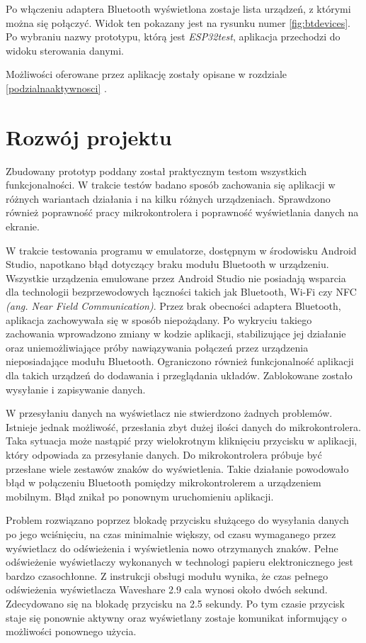 \documentclass[a4paper,12pt, twoside]{article}
\begin{document}
    	Po włączeniu adaptera Bluetooth wyświetlona zostaje lista urządzeń, z którymi można się połączyć. Widok ten pokazany jest na rysunku numer \ref{fig:btdevices}. Po wybraniu nazwy prototypu, którą jest \textit{ESP32test}, aplikacja przechodzi do widoku sterowania danymi.
    	
    	Możliwości oferowane przez aplikację zostały opisane w rozdziale \ref{podzialnaaktywnosci} .
    	\section{Rozwój projektu}
    	Zbudowany prototyp poddany został praktycznym testom wszystkich funkcjonalności. W trakcie testów badano sposób zachowania się aplikacji w różnych wariantach działania i na kilku różnych urządzeniach. Sprawdzono również poprawność pracy mikrokontrolera i poprawność wyświetlania danych na ekranie.
    	
    	W trakcie testowania programu w emulatorze, dostępnym w środowisku Android Studio, napotkano błąd dotyczący braku modułu Bluetooth w urządzeniu. Wszystkie urządzenia emulowane przez Android Studio nie posiadają wsparcia dla technologii bezprzewodowych łączności takich jak Bluetooth, Wi-Fi czy NFC \textit{(ang. Near Field Communication)}. Przez brak obecności adaptera Bluetooth, aplikacja zachowywała się w sposób niepożądany. Po wykryciu takiego zachowania wprowadzono zmiany w kodzie aplikacji, stabilizujące jej działanie oraz uniemożliwiające próby nawiązywania połączeń przez urządzenia nieposiadające modułu Bluetooth. Ograniczono również funkcjonalność aplikacji dla takich urządzeń do dodawania i przeglądania układów. Zablokowane zostało wysyłanie i zapisywanie danych.
    	
    	W przesyłaniu danych na wyświetlacz nie stwierdzono żadnych problemów. Istnieje jednak możliwość, przesłania zbyt dużej ilości danych do mikrokontrolera. Taka sytuacja może nastąpić przy wielokrotnym kliknięciu przycisku w aplikacji, który odpowiada za przesyłanie danych. Do mikrokontrolera próbuje być przesłane wiele zestawów znaków do wyświetlenia. Takie działanie powodowało błąd w połączeniu Bluetooth pomiędzy mikrokontrolerem a urządzeniem mobilnym. Błąd znikał po ponownym uruchomieniu aplikacji.
    	
    	Problem rozwiązano poprzez blokadę przycisku służącego do wysyłania danych po jego wciśnięciu, na czas minimalnie większy, od czasu wymaganego przez wyświetlacz do odświeżenia i wyświetlenia nowo otrzymanych znaków. Pełne odświeżenie wyświetlaczy wykonanych w technologi papieru elektronicznego jest bardzo czasochłonne. Z instrukcji obsługi modułu wynika, że czas pełnego odświeżenia wyświetlacza Waveshare 2.9 cala wynosi około dwóch sekund\cite{waveshare}. Zdecydowano się na blokadę przycisku na 2.5 sekundy. Po tym czasie przycisk staje się ponownie aktywny oraz wyświetlany zostaje komunikat informujący o możliwości ponownego użycia. 
    	
\end{document}
